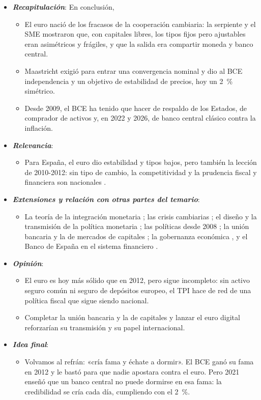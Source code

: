 \documentclass[11pt]{article}
\begin{document}
\begin{itemize}
\item \textbf{\emph{Recapitulación}}: En conclusión,
  \begin{itemize}
  \item El euro nació de los fracasos de la cooperación cambiaria: la serpiente y el SME mostraron que, con capitales libres, los tipos fijos pero ajustables eran asimétricos y frágiles, y que la salida era compartir moneda y banco central.
  \item Maastricht exigió para entrar una convergencia nominal y dio al BCE independencia y un objetivo de estabilidad de precios, hoy un 2~\% simétrico.
  \item Desde 2009, el BCE ha tenido que hacer de respaldo de los Estados, de comprador de activos y, en 2022 y 2026, de banco central clásico contra la inflación.
  \end{itemize}
\item \textbf{\emph{Relevancia}}:
  \begin{itemize}
  \item Para España, el euro dio estabilidad y tipos bajos, pero también la lección de 2010-2012: sin tipo de cambio, la competitividad y la prudencia fiscal y financiera son nacionales .
  \end{itemize}
\item \textbf{\emph{Extensiones y relación con otras partes del temario}}:
  \begin{itemize}
  \item La teoría de la integración monetaria ; las crisis cambiarias ; el diseño y la transmisión de la política monetaria  ; las políticas desde 2008 ; la unión bancaria y la de mercados de capitales ; la gobernanza económica , y el Banco de España en el sistema financiero .
  \end{itemize}
\item \textbf{\emph{Opinión}}:
  \begin{itemize}
  \item El euro es hoy más sólido que en 2012, pero sigue incompleto: sin activo seguro común ni seguro de depósitos europeo, el TPI hace de red de una política fiscal que sigue siendo nacional.

  \item Completar la unión bancaria y la de capitales y lanzar el euro digital reforzarían su transmisión y su papel internacional.
  \end{itemize}
\item \textbf{\emph{Idea final}}:
  \begin{itemize}
  \item Volvamos al refrán: «cría fama y échate a dormir». El BCE ganó su fama en 2012 y le bastó para que nadie apostara contra el euro. Pero 2021 enseñó que un banco central no puede dormirse en esa fama: la credibilidad se cría cada día, cumpliendo con el 2~\%.
  \end{itemize}
\end{itemize}
\end{document}

